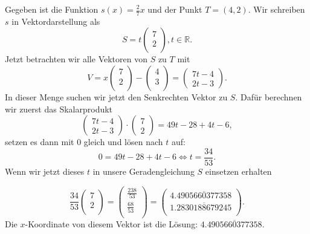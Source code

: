 \documentclass{article}
\begin{document}
Gegeben ist die Funktion \(s(x)=\frac27x\) und der Punkt \(T=(4, 2)\).
Wir schreiben \(s\) in Vektordarstellung als \[S=t\begin{pmatrix}7\\2\\\end{pmatrix}, t\in \mathbb{R}.\]
Jetzt betrachten wir alle Vektoren von \(S\) zu \(T\) mit
\[V=x\begin{pmatrix}7\\2\\\end{pmatrix} - \begin{pmatrix}4\\3\\\end{pmatrix}=
\begin{pmatrix}7t-4\\2t-3\end{pmatrix}.\] In dieser Menge suchen wir jetzt den Senkrechten Vektor
zu \(S\). Dafür berechnen wir zuerst das Skalarprodukt
\[\begin{pmatrix}7t-4\\2t-3\end{pmatrix}\cdot\begin{pmatrix}7\\2\end{pmatrix}=49t-28+4t-6,\] setzen 
es dann mit \(0\) gleich und lösen nach \(t\) auf:
\[0=49t-28+4t-6\Leftrightarrow t=\frac{34}{53}.\]
Wenn wir jetzt dieses \(t\) in unsere Geradengleichung \(S\) einsetzen erhalten

\[\frac{34}{53}\begin{pmatrix}7\\2\\\end{pmatrix}=
\begin{pmatrix}\frac{238}{53}\\\frac{68}{53}\\\end{pmatrix}=
\begin{pmatrix}4.\overline{4905660377358}\\1.\overline{2830188679245}\\\end{pmatrix}
.\]
Die \(x\)-Koordinate von diesem Vektor ist die Lösung: \(4.\overline{4905660377358}\).\\
\end{document}
